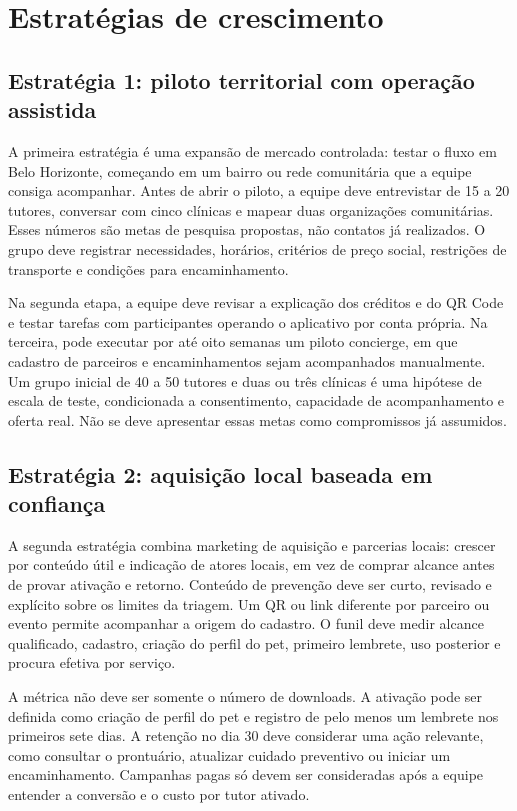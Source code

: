 \documentclass[12pt,a4paper]{article}
\begin{document}
\section{Estratégias de crescimento}

\subsection{Estratégia 1: piloto territorial com operação assistida}

A primeira estratégia é uma expansão de mercado controlada: testar o fluxo em Belo Horizonte, começando em um bairro ou rede comunitária que a equipe consiga acompanhar. Antes de abrir o piloto, a equipe deve entrevistar de 15 a 20 tutores, conversar com cinco clínicas e mapear duas organizações comunitárias. Esses números são metas de pesquisa propostas, não contatos já realizados. O grupo deve registrar necessidades, horários, critérios de preço social, restrições de transporte e condições para encaminhamento.

Na segunda etapa, a equipe deve revisar a explicação dos créditos e do QR Code e testar tarefas com participantes operando o aplicativo por conta própria. Na terceira, pode executar por até oito semanas um piloto concierge, em que cadastro de parceiros e encaminhamentos sejam acompanhados manualmente. Um grupo inicial de 40 a 50 tutores e duas ou três clínicas é uma hipótese de escala de teste, condicionada a consentimento, capacidade de acompanhamento e oferta real. Não se deve apresentar essas metas como compromissos já assumidos.

\subsection{Estratégia 2: aquisição local baseada em confiança}

A segunda estratégia combina marketing de aquisição e parcerias locais: crescer por conteúdo útil e indicação de atores locais, em vez de comprar alcance antes de provar ativação e retorno. Conteúdo de prevenção deve ser curto, revisado e explícito sobre os limites da triagem. Um QR ou link diferente por parceiro ou evento permite acompanhar a origem do cadastro. O funil deve medir alcance qualificado, cadastro, criação do perfil do pet, primeiro lembrete, uso posterior e procura efetiva por serviço.

A métrica não deve ser somente o número de downloads. A ativação pode ser definida como criação de perfil do pet e registro de pelo menos um lembrete nos primeiros sete dias. A retenção no dia 30 deve considerar uma ação relevante, como consultar o prontuário, atualizar cuidado preventivo ou iniciar um encaminhamento. Campanhas pagas só devem ser consideradas após a equipe entender a conversão e o custo por tutor ativado.
\end{document}
